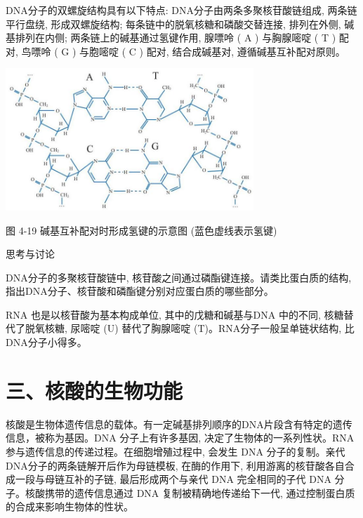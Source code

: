 \documentclass[10pt]{article}
\begin{document}
DNA分子的双螺旋结构具有以下特点: DNA分子由两条多聚核苷酸链组成, 两条链平行盘绕, 形成双螺旋结构; 每条链中的脱氧核糖和磷酸交替连接, 排列在外侧, 碱基排列在内侧; 两条链上的碱基通过氢键作用, 腺嘌呤 ( A ) 与胸腺嘧啶 ( T ) 配对, 鸟嘌呤 ( G ) 与胞嘧啶 ( C ) 配对, 结合成碱基对, 遵循碱基互补配对原则。

\begin{center}
\includegraphics[max width=0.7\textwidth]{images/0190efc5-b58a-7c43-bfb0-e0a030df9cfd_130_608913.jpg}
\end{center}

图 4-19 碱基互补配对时形成氢键的示意图 (蓝色虚线表示氢键)

\begin{mdframed}

思考与讨论

DNA分子的多聚核苷酸链中, 核苷酸之间通过磷酯键连接。请类比蛋白质的结构, 指出DNA分子、核苷酸和磷酯键分别对应蛋白质的哪些部分。

\end{mdframed}

RNA 也是以核苷酸为基本构成单位, 其中的戊糖和碱基与DNA 中的不同, 核糖替代了脱氧核糖, 尿嘧啶 (U) 替代了胸腺嘧啶 (T)。RNA分子一般呈单链状结构, 比 DNA分子小得多。

\section*{三、核酸的生物功能}

核酸是生物体遗传信息的载体。有一定碱基排列顺序的DNA片段含有特定的遗传信息，被称为基因。DNA 分子上有许多基因, 决定了生物体的一系列性状。RNA 参与遗传信息的传递过程。在细胞增殖过程中, 会发生 DNA 分子的复制。亲代DNA分子的两条链解开后作为母链模板, 在酶的作用下, 利用游离的核苷酸各自合成一段与母链互补的子链, 最后形成两个与亲代 DNA 完全相同的子代 DNA 分子。核酸携带的遗传信息通过 DNA 复制被精确地传递给下一代, 通过控制蛋白质的合成来影响生物体的性状。
\end{document}
